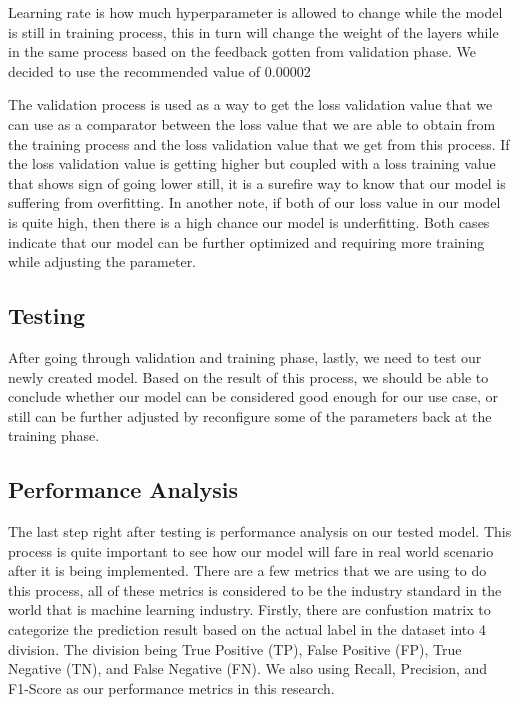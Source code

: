 Learning rate is how much hyperparameter is allowed to change while the model is still in training process, this in turn will change the weight of the layers while in the same process based on the feedback gotten from validation phase. We decided to use the recommended value of 0.00002 \cite{koto2020indolem}

The validation process is used as a way to get the loss validation value that we can use as a comparator between the loss value that we are able to obtain from the training process and the loss validation value that we get from this process. If the loss validation value is getting higher but coupled with a loss training value that shows sign of going lower still, it is a surefire way to know that our model is suffering from overfitting. In another note, if both of our loss value in our model is quite high, then there is a high chance our model is underfitting. Both cases indicate that our model can be further optimized and requiring more training while adjusting the parameter.

\subsection{Testing}

After going through validation and training phase, lastly, we need to test our newly created model. Based on the result of this process, we should be able to conclude whether our model can be considered good enough for our use case, or still can be further adjusted by reconfigure some of the parameters back at the training phase.

\subsection{Performance Analysis}

The last step right after testing is performance analysis on our tested model. This process is quite important to see how our model will fare in real world scenario after it is being implemented. There are a few metrics that we are using to do this process, all of these metrics is considered to be the industry standard in the world that is machine learning industry. Firstly, there are confustion matrix to categorize the prediction result based on the actual label in the dataset into 4 division. The division being True Positive (TP), False Positive (FP), True Negative (TN), and False Negative (FN). We also using Recall, Precision, and F1-Score as our performance metrics in this research.